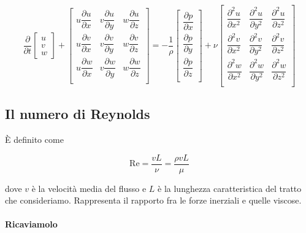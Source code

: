 \documentclass[12pt,a4paper]{article}
\numberwithin{equation}{subsection}
\begin{document}
\renewcommand{\arraystretch}{2}
\begin{equation}
\frac{\partial}{\partial t} \begin{bmatrix}
u \\
v \\
w 
\end{bmatrix} +
\begin{bmatrix}
u \dfrac{\partial u}{\partial x} & v \dfrac{\partial u}{\partial y} & w \dfrac{\partial u}{\partial z} \\
u \dfrac{\partial v}{\partial x} & v \dfrac{\partial v}{\partial y} & w \dfrac{\partial v}{\partial z} \\
u \dfrac{\partial w}{\partial x} & v \dfrac{\partial w}{\partial y} & w \dfrac{\partial w}{\partial z} \\
\end{bmatrix} =
-\dfrac{1}{\rho}
\begin{bmatrix}
\dfrac{\partial p}{\partial x} \\
\dfrac{\partial p}{\partial y} \\
\dfrac{\partial p}{\partial z} \\
\end{bmatrix} +
\nu 
\begin{bmatrix}
\dfrac{\partial^2 u}{\partial x^2} & \dfrac{\partial^2 u}{\partial y^2} & \dfrac{\partial^2 u}{\partial z^2} \\
\dfrac{\partial^2 v}{\partial x^2} & \dfrac{\partial^2 v}{\partial y^2} & \dfrac{\partial^2 v}{\partial z^2} \\
\dfrac{\partial^2 w}{\partial x^2} & \dfrac{\partial^2 w}{\partial y^2} & \dfrac{\partial^2 w}{\partial z^2} \\
\end{bmatrix}
\end{equation}

\subsection{Il numero di Reynolds}

È definito come

\begin{equation}
\text{Re} = \frac{v L}{\nu} = \frac{\rho v L}{\mu}
\end{equation}

dove $v$ è la velocità media del flusso e $L$ è la lunghezza caratteristica del tratto che consideriamo.
Rappresenta il rapporto fra le forze inerziali e quelle viscose.

\paragraph{Ricaviamolo}
\end{document}
